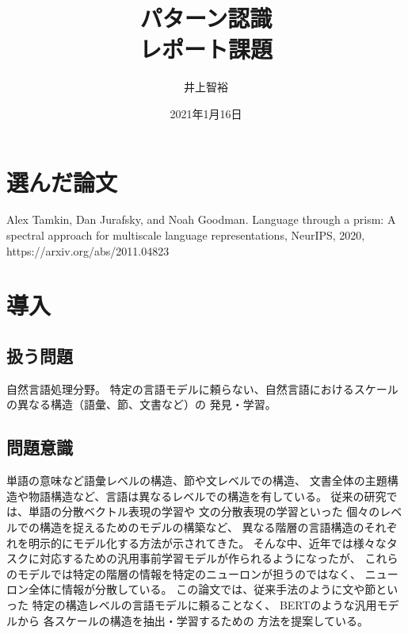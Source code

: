 \documentclass{jsarticle}
\title{\vspace{-3cm}パターン認識\\レポート課題}
\author{井上智裕}
\date{2021年1月16日}
\begin{document}
\maketitle
\vspace{-1cm}
\section{選んだ論文}
Alex Tamkin, Dan Jurafsky, and Noah Goodman. Language through a prism: A spectral approach for multiscale language representations, NeurIPS, 2020, https://arxiv.org/abs/2011.04823

\section{導入}
\subsection{扱う問題}
自然言語処理分野。
特定の言語モデルに頼らない、自然言語におけるスケールの異なる構造（語彙、節、文書など）の
発見・学習。

\subsection{問題意識}
単語の意味など語彙レベルの構造、節や文レベルでの構造、
文書全体の主題構造や物語構造など、言語は異なるレベルでの構造を有している。
従来の研究では、単語の分散ベクトル表現の学習\cite{mikolov2013distributed}や
文の分散表現の学習\cite{hill-etal-2016-learning-distributed}といった
個々のレベルでの構造を捉えるためのモデルの構築など、
異なる階層の言語構造のそれぞれを明示的にモデル化する方法が示されてきた。
そんな中、近年では様々なタスクに対応するための汎用事前学習モデルが作られるようになったが、
これらのモデルでは特定の階層の情報を特定のニューロンが担うのではなく、
ニューロン全体に情報が分散している。
この論文では、従来手法のように文や節といった
特定の構造レベルの言語モデルに頼ることなく、
BERT\cite{devlin2019bert}のような汎用モデルから
各スケールの構造を抽出・学習するための
方法を提案している。
\end{document}
